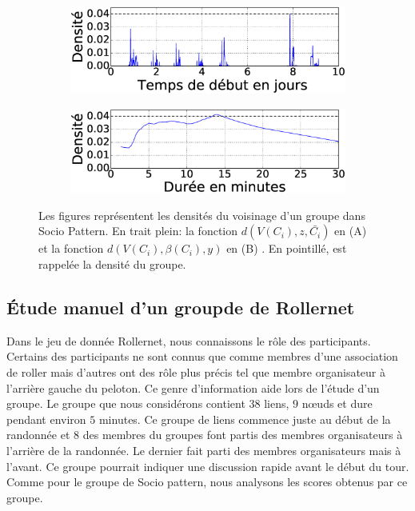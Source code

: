 \begin{figure}
\centering
\begin{subfigure}{0.45\linewidth}
	\includegraphics[width=\linewidth]{img/GroupeDense/GroupExample/SocioPattern/vairable_start9522.eps}
	\caption{}
	\label{fig:g9522_debut}
\end{subfigure}
\begin{subfigure}{0.45\linewidth}
	\includegraphics[width=\linewidth]{img/GroupeDense/GroupExample/SocioPattern/vairable_duration9522}
	\caption{}
	\label{fig:g9522_duree}
\end{subfigure}
\caption{
Les figures représentent les densités du voisinage d'un groupe dans Socio Pattern.
En trait plein: la fonction $d(V(C_i),z,\bar{C_i})$ en (A) et la fonction  $d(V(C_i),\beta(C_i),y)$ en (B) .
En pointillé, est rappelée la densité du groupe.
}
\label{fig:Sp_g9522_exemple}
\end{figure}

\subsection{\'Etude manuel d'un groupde de Rollernet}
Dans le jeu de donnée Rollernet, nous connaissons le rôle des participants.
Certains des participants ne sont connus que comme membres d'une association de roller mais d'autres ont des rôle plus précis tel que membre organisateur à l'arrière gauche du peloton.
Ce genre d'information aide lors de l'étude d'un groupe.
Le groupe que nous considérons contient $38$ liens, $9$ n\oe uds et dure pendant environ $5$ minutes.
Ce groupe de liens commence juste au début de la randonnée et $8$ des membres du groupes font partis des membres organisateurs à l'arrière de la randonnée.
Le dernier fait parti des membres organisateurs mais à l'avant.
Ce groupe pourrait indiquer une discussion rapide avant le début du tour.
Comme pour le groupe de Socio pattern, nous analysons les scores obtenus par ce groupe.


